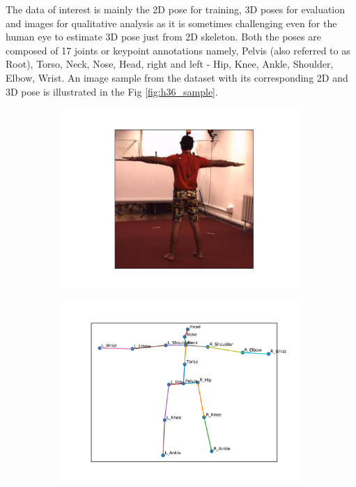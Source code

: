 The data of interest is mainly the 2D pose for training, 3D poses for evaluation and images for qualitative analysis as it is sometimes challenging even for the human eye to estimate 3D pose just from 2D skeleton. Both the poses are composed of 17 joints or keypoint annotations namely, Pelvis (also referred to as Root), Torso, Neck, Nose, Head, right and left - Hip, Knee, Ankle, Shoulder, Elbow, Wrist. An image sample from the dataset with its corresponding 2D and 3D pose is illustrated in the Fig \ref{fig:h36_sample}. 

\begin{figure}
    \centering
    \begin{subfigure}[b]{0.3\textwidth}
        \centering
        \includegraphics[width=\textwidth]{figures/h36_viz/h36image.png}
        \caption{}
    \end{subfigure}
    \hfill
    \begin{subfigure}[b]{0.3\textwidth}
        \centering
        \includegraphics[width=\textwidth]{figures/h36_viz/h362d.png}

\end{subfigure}
\end{figure}
